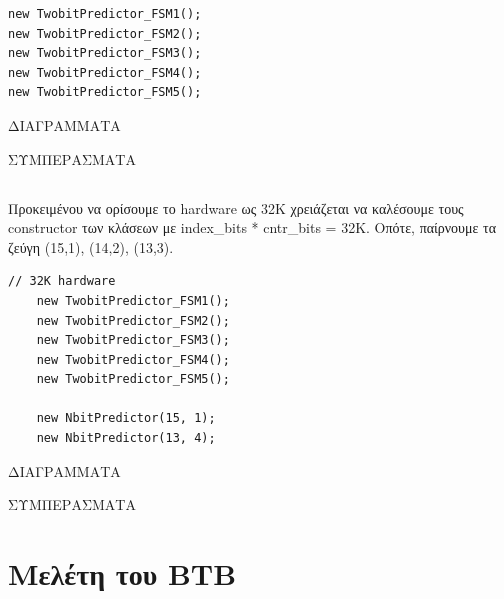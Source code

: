 \documentclass{article}
\begin{document}
\begin{lstlisting}[style=cppstyle]
new TwobitPredictor_FSM1();
new TwobitPredictor_FSM2();
new TwobitPredictor_FSM3();
new TwobitPredictor_FSM4();
new TwobitPredictor_FSM5();
\end{lstlisting}

ΔΙΑΓΡΑΜΜΑΤΑ

ΣΥΜΠΕΡΑΣΜΑΤΑ

\subsection{}
Προκειμένου να ορίσουμε το hardware ως 32Κ χρειάζεται να καλέσουμε τους constructor των κλάσεων με index\_bits * cntr\_bits = 32K. Οπότε, παίρνουμε τα ζεύγη (15,1), (14,2), (13,3).
\begin{lstlisting}[style=cppstyle]
    // 32K hardware
    new TwobitPredictor_FSM1();
    new TwobitPredictor_FSM2();
    new TwobitPredictor_FSM3();
    new TwobitPredictor_FSM4();
    new TwobitPredictor_FSM5();

    new NbitPredictor(15, 1);
    new NbitPredictor(13, 4);
\end{lstlisting}

ΔΙΑΓΡΑΜΜΑΤΑ

ΣΥΜΠΕΡΑΣΜΑΤΑ

\section{Μελέτη του ΒΤΒ}
\end{document}
